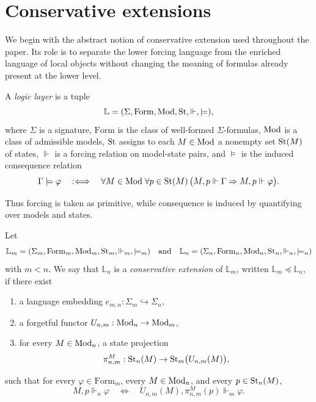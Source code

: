 \section{Conservative extensions}\label{sec:preliminaries}

We begin with the abstract notion of conservative extension used throughout the paper. Its role is to separate the lower forcing language from the enriched language of local objects without changing the meaning of formulas already present at the lower level.

\begin{definition}\label{def:logic-layer}
A \emph{logic layer} is a tuple
\[
\mathbb{L}=(\Sigma,\mathrm{Form},\mathrm{Mod},\mathrm{St},\Vdash,\models),
\]
where $\Sigma$ is a signature, $\mathrm{Form}$ is the class of well-formed $\Sigma$-formulas, $\mathrm{Mod}$ is a class of admissible models, $\mathrm{St}$ assigns to each $M\in\mathrm{Mod}$ a nonempty set $\mathrm{St}(M)$ of states, $\Vdash$ is a forcing relation on model-state pairs, and $\models$ is the induced consequence relation
\[
\Gamma\models\varphi
\quad:\Longleftrightarrow\quad
\forall M\in\mathrm{Mod}\;\forall p\in\mathrm{St}(M)\,
\bigl(M,p\Vdash\Gamma \Rightarrow M,p\Vdash\varphi\bigr).
\]
\end{definition}

Thus forcing is taken as primitive, while consequence is induced by quantifying over models and states.

\begin{definition}\label{def:conservative-extension}
Let
\[
\mathbb{L}_m=(\Sigma_m,\mathrm{Form}_m,\mathrm{Mod}_m,\mathrm{St}_m,\Vdash_m,\models_m)
\quad\text{and}\quad
\mathbb{L}_n=(\Sigma_n,\mathrm{Form}_n,\mathrm{Mod}_n,\mathrm{St}_n,\Vdash_n,\models_n)
\]
with $m<n$. We say that $\mathbb{L}_n$ is a \emph{conservative extension} of $\mathbb{L}_m$, written $\mathbb{L}_m\preceq\mathbb{L}_n$, if there exist
\begin{enumerate}[label=(\roman*),nosep]
\item a language embedding $e_{m,n}:\Sigma_m\hookrightarrow\Sigma_n$,
\item a forgetful functor $U_{n,m}:\mathrm{Mod}_n\to\mathrm{Mod}_m$,
\item for every $M\in\mathrm{Mod}_n$, a state projection
\[
\pi^M_{n,m}:\mathrm{St}_n(M)\to \mathrm{St}_m\bigl(U_{n,m}(M)\bigr),
\]
\end{enumerate}
such that for every $\varphi\in \mathrm{Form}_m$, every $M\in\mathrm{Mod}_n$, and every $p\in\mathrm{St}_n(M)$,
\begin{equation}\label{eq:conservative-extension}
M,p\Vdash_n \varphi
\quad\Longleftrightarrow\quad
U_{n,m}(M),\pi^M_{n,m}(p)\Vdash_m \varphi.
\end{equation}
\end{definition}

